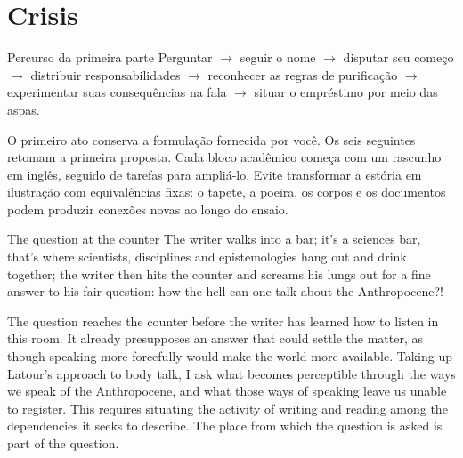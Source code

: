 \section{Crisis}
\label{sec:crisis}

\begin{orientacao}{Percurso da primeira parte}
Perguntar $\rightarrow$ seguir o nome $\rightarrow$ disputar seu começo
$\rightarrow$ distribuir responsabilidades $\rightarrow$ reconhecer as
regras de purificação $\rightarrow$ experimentar suas consequências na
fala $\rightarrow$ situar o empréstimo por meio das aspas.

O primeiro ato conserva a formulação fornecida por você. Os seis seguintes
retomam a primeira proposta. Cada bloco acadêmico começa com um rascunho
em inglês, seguido de tarefas para ampliá-lo. Evite transformar a estória
em ilustração com equivalências fixas: o tapete, a poeira, os corpos e os
documentos podem produzir conexões novas ao longo do ensaio.
\end{orientacao}

\begin{ato}{The question at the counter}
The writer walks into a bar; it’s a sciences bar, that’s where scientists,
disciplines and epistemologies hang out and drink together; the writer
then hits the counter and screams his lungs out for a fine answer to his
fair question: how the hell can one talk about the Anthropocene?!
\end{ato}

The question reaches the counter before the writer has learned how to
listen in this room. It already presupposes an answer that could settle
the matter, as though speaking more forcefully would make the world more
available. Taking up Latour's approach to body talk, I ask what becomes
perceptible through the ways we speak of the Anthropocene, and what those
ways of speaking leave us unable to register.
This requires situating the activity of writing and reading among the
dependencies it seeks to describe. The place from which the question is
asked is part of the question.

